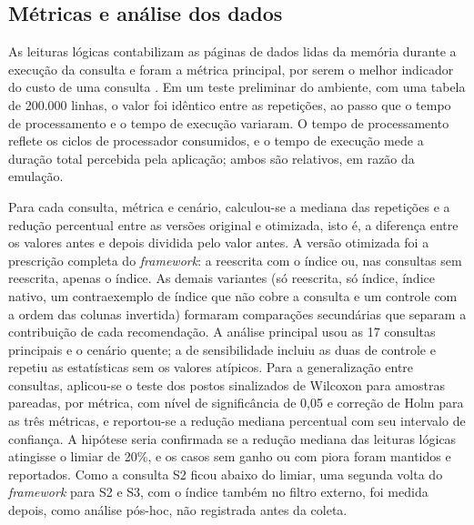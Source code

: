 \subsection{Métricas e análise dos dados}\label{sec:analise}

As leituras lógicas contabilizam as páginas de dados lidas da memória durante a execução da consulta e foram a métrica principal, por serem o melhor indicador do custo de uma consulta \cite{rusanu2014perf}. Em um teste preliminar do ambiente, com uma tabela de 200.000 linhas, o valor foi idêntico entre as repetições, ao passo que o tempo de processamento e o tempo de execução variaram. O tempo de processamento reflete os ciclos de processador consumidos, e o tempo de execução mede a duração total percebida pela aplicação; ambos são relativos, em razão da emulação.

Para cada consulta, métrica e cenário, calculou-se a mediana das repetições e a redução percentual entre as versões original e otimizada, isto é, a diferença entre os valores antes e depois dividida pelo valor antes. A versão otimizada foi a prescrição completa do \textit{framework}: a reescrita com o índice ou, nas consultas sem reescrita, apenas o índice. As demais variantes (só reescrita, só índice, índice nativo, um contraexemplo de índice que não cobre a consulta e um controle com a ordem das colunas invertida) formaram comparações secundárias que separam a contribuição de cada recomendação. A análise principal usou as 17 consultas principais e o cenário quente; a de sensibilidade incluiu as duas de controle e repetiu as estatísticas sem os valores atípicos. Para a generalização entre consultas, aplicou-se o teste dos postos sinalizados de Wilcoxon para amostras pareadas, por métrica, com nível de significância de 0,05 e correção de Holm para as três métricas, e reportou-se a redução mediana percentual com seu intervalo de confiança. A hipótese seria confirmada se a redução mediana das leituras lógicas atingisse o limiar de 20\%, e os casos sem ganho ou com piora foram mantidos e reportados. Como a consulta S2 ficou abaixo do limiar, uma segunda volta do \textit{framework} para S2 e S3, com o índice também no filtro externo, foi medida depois, como análise pós-hoc, não registrada antes da coleta. 
